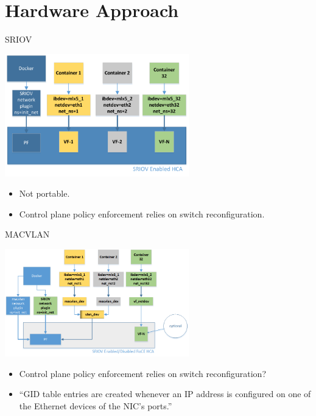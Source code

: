 \documentclass{beamer}
\begin{document}
\section{Hardware Approach}

\begin{frame}{SRIOV}
    \begin{center}
        \includegraphics[width=0.6\textwidth]{sriovmlnx.png}
    \end{center}

    \begin{itemize}
        \item Not portable.
        \item Control plane policy enforcement relies on switch reconfiguration.
    \end{itemize}
\end{frame}

\begin{frame}{MACVLAN}
    \begin{center}
        \includegraphics[width=0.6\textwidth]{macvlanmnlx.png}
    \end{center}

    \begin{itemize}
        \item Control plane policy enforcement relies on switch reconfiguration?
        \item ``GID table entries are created whenever an IP address is configured on one of the Ethernet devices of the NIC's ports.''
    \end{itemize}
\end{frame}
\end{document}

